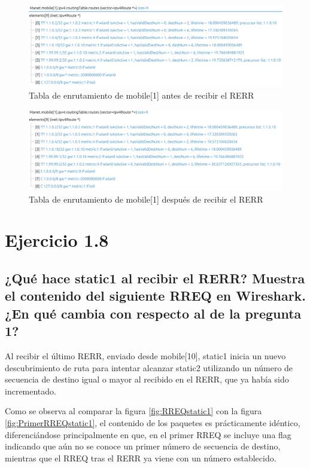 \begin{figure}[H]
    \centering
    \includegraphics[width=125mm, scale=0.75]{imaxes/aodv/ejercicio7_1.png}
    \caption{Tabla de enrutamiento de mobile[1] antes de recibir el RERR}
    \label{fig:RerrRouteTablePre}
\end{figure}

\begin{figure}[H]
    \centering
    \includegraphics[width=125mm, scale=0.75]{imaxes/aodv/ejercicio7_2.png}
    \caption{Tabla de enrutamiento de mobile[1] después de recibir el RERR}
    \label{fig:RerrRouteTablePos}
\end{figure}

\vspace{1.25cm}
\newpage
\section{Ejercicio 1.8}

\subsection{¿Qué hace static1 al recibir el RERR? Muestra el contenido del siguiente RREQ en Wireshark. ¿En qué cambia
con respecto al de la pregunta 1?}

Al recibir el último RERR, enviado desde mobile[10], static1 inicia un nuevo descubrimiento de ruta para intentar alcanzar static2 utilizando un número de secuencia de destino igual o mayor al recibido en el RERR, que ya había sido incrementado.

Como se observa al comparar la figura \ref{fig:RREQstatic1} con la figura \ref{fig:PrimerRREQstatic1}, el contenido de los paquetes es prácticamente idéntico, diferenciándose principalmente en que, en el primer RREQ se incluye una flag indicando que aún no se conoce un primer número de secuencia de destino, mientras que el RREQ tras el RERR ya viene con un número establecido.

